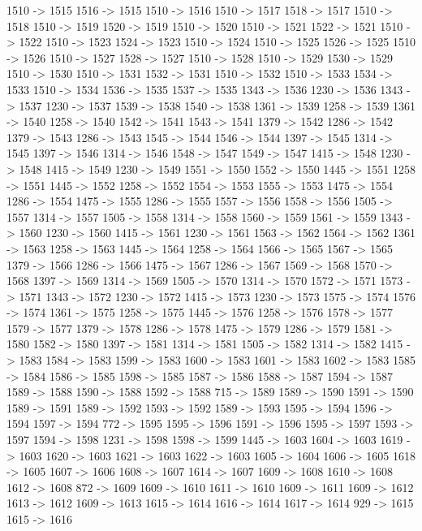 {	1510 -> 1515
	1516 -> 1515
	1510 -> 1516
	1510 -> 1517
	1518 -> 1517
	1510 -> 1518
	1510 -> 1519
	1520 -> 1519
	1510 -> 1520
	1510 -> 1521
	1522 -> 1521
	1510 -> 1522
	1510 -> 1523
	1524 -> 1523
	1510 -> 1524
	1510 -> 1525
	1526 -> 1525
	1510 -> 1526
	1510 -> 1527
	1528 -> 1527
	1510 -> 1528
	1510 -> 1529
	1530 -> 1529
	1510 -> 1530
	1510 -> 1531
	1532 -> 1531
	1510 -> 1532
	1510 -> 1533
	1534 -> 1533
	1510 -> 1534
	1536 -> 1535
	1537 -> 1535
	1343 -> 1536
	1230 -> 1536
	1343 -> 1537
	1230 -> 1537
	1539 -> 1538
	1540 -> 1538
	1361 -> 1539
	1258 -> 1539
	1361 -> 1540
	1258 -> 1540
	1542 -> 1541
	1543 -> 1541
	1379 -> 1542
	1286 -> 1542
	1379 -> 1543
	1286 -> 1543
	1545 -> 1544
	1546 -> 1544
	1397 -> 1545
	1314 -> 1545
	1397 -> 1546
	1314 -> 1546
	1548 -> 1547
	1549 -> 1547
	1415 -> 1548
	1230 -> 1548
	1415 -> 1549
	1230 -> 1549
	1551 -> 1550
	1552 -> 1550
	1445 -> 1551
	1258 -> 1551
	1445 -> 1552
	1258 -> 1552
	1554 -> 1553
	1555 -> 1553
	1475 -> 1554
	1286 -> 1554
	1475 -> 1555
	1286 -> 1555
	1557 -> 1556
	1558 -> 1556
	1505 -> 1557
	1314 -> 1557
	1505 -> 1558
	1314 -> 1558
	1560 -> 1559
	1561 -> 1559
	1343 -> 1560
	1230 -> 1560
	1415 -> 1561
	1230 -> 1561
	1563 -> 1562
	1564 -> 1562
	1361 -> 1563
	1258 -> 1563
	1445 -> 1564
	1258 -> 1564
	1566 -> 1565
	1567 -> 1565
	1379 -> 1566
	1286 -> 1566
	1475 -> 1567
	1286 -> 1567
	1569 -> 1568
	1570 -> 1568
	1397 -> 1569
	1314 -> 1569
	1505 -> 1570
	1314 -> 1570
	1572 -> 1571
	1573 -> 1571
	1343 -> 1572
	1230 -> 1572
	1415 -> 1573
	1230 -> 1573
	1575 -> 1574
	1576 -> 1574
	1361 -> 1575
	1258 -> 1575
	1445 -> 1576
	1258 -> 1576
	1578 -> 1577
	1579 -> 1577
	1379 -> 1578
	1286 -> 1578
	1475 -> 1579
	1286 -> 1579
	1581 -> 1580
	1582 -> 1580
	1397 -> 1581
	1314 -> 1581
	1505 -> 1582
	1314 -> 1582
	1415 -> 1583
	1584 -> 1583
	1599 -> 1583
	1600 -> 1583
	1601 -> 1583
	1602 -> 1583
	1585 -> 1584
	1586 -> 1585
	1598 -> 1585
	1587 -> 1586
	1588 -> 1587
	1594 -> 1587
	1589 -> 1588
	1590 -> 1588
	1592 -> 1588
	715 -> 1589
	1589 -> 1590
	1591 -> 1590
	1589 -> 1591
	1589 -> 1592
	1593 -> 1592
	1589 -> 1593
	1595 -> 1594
	1596 -> 1594
	1597 -> 1594
	772 -> 1595
	1595 -> 1596
	1591 -> 1596
	1595 -> 1597
	1593 -> 1597
	1594 -> 1598
	1231 -> 1598
	1598 -> 1599
	1445 -> 1603
	1604 -> 1603
	1619 -> 1603
	1620 -> 1603
	1621 -> 1603
	1622 -> 1603
	1605 -> 1604
	1606 -> 1605
	1618 -> 1605
	1607 -> 1606
	1608 -> 1607
	1614 -> 1607
	1609 -> 1608
	1610 -> 1608
	1612 -> 1608
	872 -> 1609
	1609 -> 1610
	1611 -> 1610
	1609 -> 1611
	1609 -> 1612
	1613 -> 1612
	1609 -> 1613
	1615 -> 1614
	1616 -> 1614
	1617 -> 1614
	929 -> 1615
	1615 -> 1616
}
